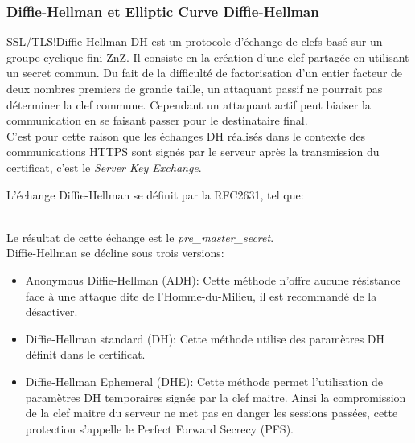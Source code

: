 \documentclass[twoside,a4paper,12pt,titlepage]{book}
\begin{document}
\subsubsection{Diffie-Hellman et Elliptic Curve Diffie-Hellman}
\begin{Define}{SSL/TLS!Diffie-Hellman}
\gls{DH} est un protocole d'échange de clefs basé sur un groupe cyclique fini \gls{ZnZ}. Il consiste en la création d'une clef partagée en utilisant un secret commun. Du fait de la difficulté de factorisation d'un entier facteur de deux nombres premiers de grande taille, un attaquant passif ne pourrait pas déterminer la clef commune. Cependant un attaquant actif peut biaiser la communication en se faisant passer pour le destinataire final.\\
C'est pour cette raison que les échanges \gls{DH} réalisés dans le contexte des communications \gls{HTTPS} sont signés par le serveur après la transmission du certificat, c'est le \textit{Server Key Exchange}.
\end{Define}
L'échange Diffie-Hellman se définit par la RFC2631, tel que:\\
 \\
Le résultat de cette échange est le \textit{pre\_master\_secret}.\\
Diffie-Hellman se décline sous trois versions:\begin{itemize}
\item Anonymous Diffie-Hellman (ADH): Cette méthode n'offre aucune résistance face à une attaque dite de l'Homme-du-Milieu, il est recommandé de la désactiver.
\item Diffie-Hellman standard (DH): Cette méthode utilise des paramètres DH définit dans le certificat.
\item Diffie-Hellman Ephemeral (DHE): Cette méthode permet l'utilisation de paramètres DH temporaires signée par la clef maitre. Ainsi la compromission de la clef maitre du serveur ne met pas en danger les sessions passées, cette protection s'appelle le Perfect Forward Secrecy (PFS).
\end{itemize}
\end{document}
